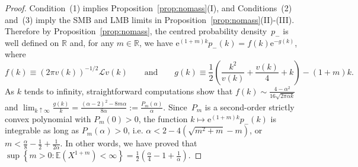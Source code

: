 \documentclass{amsart}[11pt]
\numberwithin{equation}{section}
\theoremstyle{definition}
\newcommand{\RR}{\mathbb{R}}
\newcommand{\Ll}{\mathcal{L}}
\newcommand{\E}{\mathrm{e}}
\begin{document}
\begin{proof}
Condition~(1) implies Proposition~\ref{prop:nomass}(I), 
and Conditions~(2) and~(3) imply the SMB and LMB limits in Proposition~\ref{prop:nomass}(II)-(III). 
Therefore by Proposition~\ref{prop:nomass}, the centred probability density~$p_-$ is well defined on $\RR$ and, 
for any $m\in\RR$, we have 
$\E^{(1+m)k} p_-(k) = f(k) \E^{-g(k)}$, where
$$
f(k) \equiv \left(2 \pi v(k)\right)^{-1/2}\Ll v(k)
\qquad\text{and}\qquad
g(k) \equiv \frac{1}{2} \left(\frac{k^2}{v(k)} + \frac{v(k)}{4} + k\right) - (1+m)k.
$$
As $k$ tends to infinity, straightforward computations show that 
$f(k) \sim \frac{4-\alpha^2}{16\sqrt{2\pi \alpha k}}$
and 
$\lim_{k\uparrow \infty}\frac{g(k)}{k}
 = \frac{(\alpha-2)^2-8m\alpha}{8\alpha}:=\frac{P_m(\alpha)}{\alpha}$.
Since~$P_m$ is a second-order strictly convex polynomial with $P_m(0)>0$,
the function $k\mapsto \E^{(1+m)k} p_-(k)$ is integrable as long as $P_m(\alpha)>0$, i.e.
$\alpha<2-4\left(\sqrt{m^2+m}-m\right)$, or
$m<\frac{\alpha}{8}-\frac{1}{2}+\frac{1}{2 \alpha}$.
In other words, we have proved that
$\sup\left\{m>0 : \mathbb{E}\left(X^{1+m}\right)<\infty \right\} 
= \frac{1}{2}\left(\frac{\alpha}{4}-1+\frac{1}{\alpha}\right)$.
\end{proof}
\end{document}
